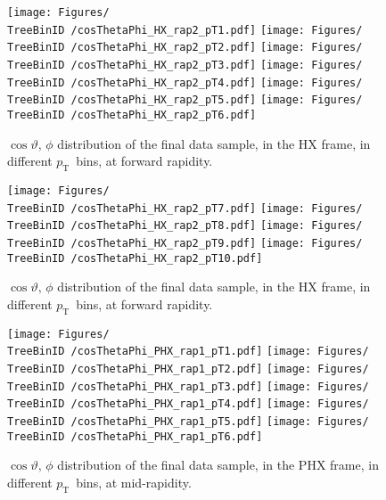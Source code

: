 \documentclass[12pt]{article}
\newcommand{\pt}{$p_{\mathrm{T}}$}
\providecommand{\TreeBinID}[1]{TreeBinIDDefault_rap1pt1}%
\begin{document}
\begin{figure}[htbp]
\centering
\texttt{[image: Figures/\\TreeBinID /cosThetaPhi\_HX\_rap2\_pT1.pdf]}
\texttt{[image: Figures/\\TreeBinID /cosThetaPhi\_HX\_rap2\_pT2.pdf]}
\texttt{[image: Figures/\\TreeBinID /cosThetaPhi\_HX\_rap2\_pT3.pdf]}
\texttt{[image: Figures/\\TreeBinID /cosThetaPhi\_HX\_rap2\_pT4.pdf]}
\texttt{[image: Figures/\\TreeBinID /cosThetaPhi\_HX\_rap2\_pT5.pdf]}
\texttt{[image: Figures/\\TreeBinID /cosThetaPhi\_HX\_rap2\_pT6.pdf]}
\caption{$\cos\vartheta,\,\phi$ distribution of the final data sample, in the HX
frame, in different \pt\ bins, at forward rapidity.}
\end{figure}
\clearpage

\begin{figure}[htbp]
\centering
\texttt{[image: Figures/\\TreeBinID /cosThetaPhi\_HX\_rap2\_pT7.pdf]}
\texttt{[image: Figures/\\TreeBinID /cosThetaPhi\_HX\_rap2\_pT8.pdf]}
\texttt{[image: Figures/\\TreeBinID /cosThetaPhi\_HX\_rap2\_pT9.pdf]}
\texttt{[image: Figures/\\TreeBinID /cosThetaPhi\_HX\_rap2\_pT10.pdf]}
\caption{$\cos\vartheta,\,\phi$ distribution of the final data sample, in the HX
frame, in different \pt\ bins, at forward rapidity.}
\end{figure}
\clearpage





\begin{figure}[htbp]
\centering
\texttt{[image: Figures/\\TreeBinID /cosThetaPhi\_PHX\_rap1\_pT1.pdf]}
\texttt{[image: Figures/\\TreeBinID /cosThetaPhi\_PHX\_rap1\_pT2.pdf]}
\texttt{[image: Figures/\\TreeBinID /cosThetaPhi\_PHX\_rap1\_pT3.pdf]}
\texttt{[image: Figures/\\TreeBinID /cosThetaPhi\_PHX\_rap1\_pT4.pdf]}
\texttt{[image: Figures/\\TreeBinID /cosThetaPhi\_PHX\_rap1\_pT5.pdf]}
\texttt{[image: Figures/\\TreeBinID /cosThetaPhi\_PHX\_rap1\_pT6.pdf]}
\caption{$\cos\vartheta,\,\phi$ distribution of the final data sample, in the PHX
frame, in different \pt\ bins, at mid-rapidity.}
\end{figure}
\clearpage
\end{document}

